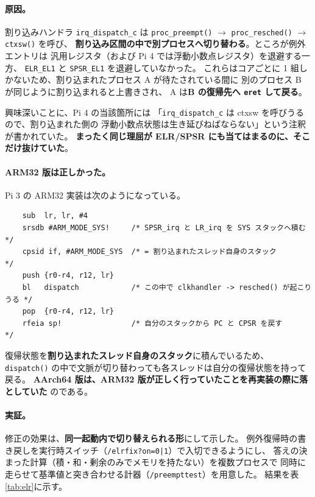 \documentclass[a4paper,11pt]{ltjsarticle}
\begin{document}
\paragraph{原因。}割り込みハンドラ \texttt{irq\_dispatch\_c} は
\texttt{proc\_preempt()} $\to$ \texttt{proc\_resched()} $\to$ \texttt{ctxsw()} を呼び、
\textbf{割り込み区間の中で別プロセスへ切り替わる}。ところが例外エントリは
汎用レジスタ（および Pi 4 では浮動小数点レジスタ）を退避する一方、
\texttt{ELR\_EL1} と \texttt{SPSR\_EL1} を退避していなかった。
これらはコアごとに 1 組しかないため、割り込まれたプロセス A が待たされている間に
別のプロセス B が同じように割り込まれると上書きされ、
A は\textbf{B の復帰先へ \texttt{eret} して戻る}。

興味深いことに、Pi 4 の当該箇所には
「\texttt{irq\_dispatch\_c} は ctxsw を呼びうるので、割り込まれた側の
浮動小数点状態は生き延びねばならない」という注釈が書かれていた。
\textbf{まったく同じ理屈が ELR/SPSR にも当てはまるのに、そこだけ抜けていた}。

\paragraph{ARM32 版は正しかった。}Pi 3 の ARM32 実装は次のようになっている。

\begin{lstlisting}
    sub  lr, lr, #4
    srsdb #ARM_MODE_SYS!     /* SPSR_irq と LR_irq を SYS スタックへ積む      */
    cpsid if, #ARM_MODE_SYS  /* = 割り込まれたスレッド自身のスタック          */
    push {r0-r4, r12, lr}
    bl   dispatch            /* この中で clkhandler -> resched() が起こりうる */
    pop  {r0-r4, r12, lr}
    rfeia sp!                /* 自分のスタックから PC と CPSR を戻す          */
\end{lstlisting}

\noindent
復帰状態を\textbf{割り込まれたスレッド自身のスタック}に積んでいるため、
\texttt{dispatch()} の中で文脈が切り替わっても各スレッドは自分の復帰状態を持って戻る。
\textbf{AArch64 版は、ARM32 版が正しく行っていたことを再実装の際に落としていた}
のである。

\paragraph{実証。}修正の効果は、\textbf{同一起動内で切り替えられる形}にして示した。
例外復帰時の書き戻しを実行時スイッチ（\texttt{/elrfix?on=0|1}）で入切できるようにし、
答えの決まった計算（積・和・剰余のみでメモリを持たない）を複数プロセスで
同時に走らせて基準値と突き合わせる計器（\texttt{/preempttest}）を用意した。
結果を表\ref{tab:elr}に示す。
\end{document}
